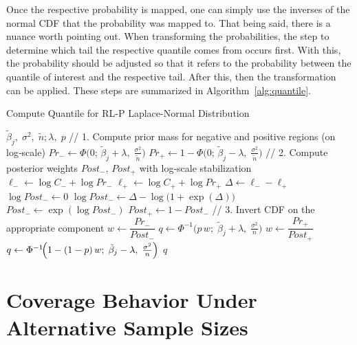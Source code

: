 

Once the respective probability is mapped, one can simply use the inverses of the normal CDF that the probability was mapped to. That being said, there is a nuance worth pointing out. When transforming the probabilities, the step to determine which tail the respective quantile comes from occurs first. With this, the probability should be adjusted so that it refers to the probability between the quantile of interest and the respective tail. After this, then the transformation can be applied. These steps are summarized in Algorithm~\ref{alg:quantile}.

\begin{algorithm}
\caption{Compute Quantile for RL-P Laplace-Normal Distribution}
\label{alg:quantile}
\begin{algorithmic}[1]
  \Require
    $\tilde{\beta}_j,\;\sigma^2,\;\tilde{n};\lambda,\;p$ 
  \Statex
  \State // 1. Compute prior mass for negative and positive regions (on log‐scale)
  \State $Pr_{-} \gets \Phi\bigl(0;\,\tilde{\beta}_j + \lambda,\;\tfrac{\sigma^2}{\tilde{n}}\bigr)$
  \State $Pr_{+} \gets 1 - \Phi\bigl(0;\,\tilde{\beta}_j - \lambda,\;\tfrac{\sigma^2}{\tilde{n}}\bigr)$
  \Statex
  \State // 2. Compute posterior weights $Post_{-},\,Post_{+}$ with log‐scale stabilization
  \State $\ell_{-} \gets \log C_{-} + \log Pr_{-}$
  \State $\ell_{+} \gets \log C_{+} + \log Pr_{+}$
  \State $\Delta \gets \ell_{-} - \ell_{+}$
  \If{$\exp(\Delta) = \infty$}
    \State $\log Post_{-} \gets 0$  
  \Else
    \State $\log Post_{-} \gets \Delta - \log\bigl(1 + \exp(\Delta)\bigr)$
  \EndIf
  \State $Post_{-} \gets \exp(\log Post_{-})$
  \State $Post_{+} \gets 1 - Post_{-}$
  \Statex
  \State // 3. Invert CDF on the appropriate component
    \State $w \gets \dfrac{Pr_{-}}{Post_{-}}$
    \State $q \gets \Phi^{-1}\bigl(p \,w;\;\tilde{\beta}_j + \lambda,\;\tfrac{\sigma^2}{n}\bigr)$
  \Else
    \State $w \gets \dfrac{Pr_{+}}{Post_{+}}$
    \State $q \gets \Phi^{-1}\!\Bigl(1 - (1-p)\,w;\;\tilde{\beta}_j - \lambda,\;\tfrac{\sigma^2}{n}\Bigr)$
  \EndIf
  \State \Return $q$
\end{algorithmic}
\end{algorithm}

\clearpage

\section{Coverage Behavior Under Alternative Sample Sizes}\label{Sup:alt_ns}

